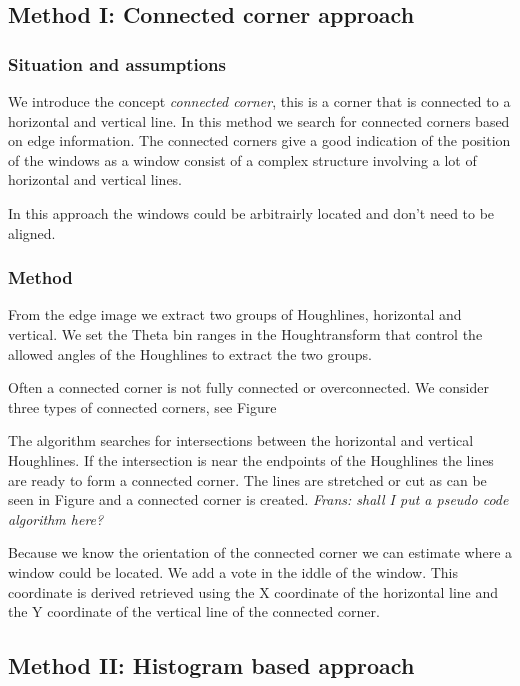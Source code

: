 \subsection{Method I: Connected corner approach} 
\subsubsection{Situation and assumptions}
We introduce the concept \emph{connected corner}, this is a corner that is 
connected to a horizontal and vertical line.  
In this method we search for connected corners based on edge information.
The connected corners give a good indication of the position of the windows as 
a window consist of a complex structure involving a lot of horizontal and vertical lines.

In this approach the windows could be arbitrairly located and don't need
to be aligned.

\subsubsection{Method}
From the edge image we extract two groups of Houghlines, horizontal and
vertical.  We set the Theta bin ranges in the Houghtransform that control the
allowed angles of the Houghlines to extract the two groups.

Often a connected corner is not fully connected or overconnected.
We consider three types of connected corners, see Figure %

The algorithm searches for intersections between the horizontal and vertical
Houghlines.  If the intersection is near the endpoints of the Houghlines the
lines are ready to form a connected corner.  The lines are stretched or cut as
can be seen in Figure and a connected corner is created. 
\emph{Frans: shall I put a pseudo code algorithm here?}

Because we know the orientation of the connected corner we can estimate where
a window could be located.  We add a vote in the iddle of the window. This
coordinate is derived retrieved using the X coordinate of the horizontal line
and the Y coordinate of the vertical line of the connected corner.




\subsection{Method II: Histogram based approach} 
